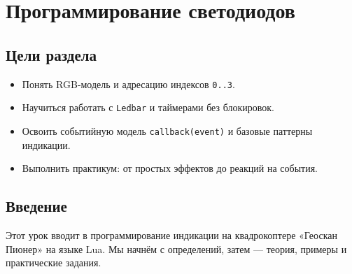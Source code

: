 \section{Программирование светодиодов}
\subsection*{Цели раздела}
\begin{itemize}
  \item Понять RGB‑модель и адресацию индексов \texttt{0..3}.
  \item Научиться работать с \texttt{Ledbar} и таймерами без блокировок.
  \item Освоить событийную модель \texttt{callback(event)} и базовые паттерны индикации.
  \item Выполнить практикум: от простых эффектов до реакций на события.
\end{itemize}
\subsection{Введение}
Этот урок вводит в программирование индикации на квадрокоптере «Геоскан Пионер» на языке Lua. Мы начнём с определений, затем — теория, примеры и практические задания.


